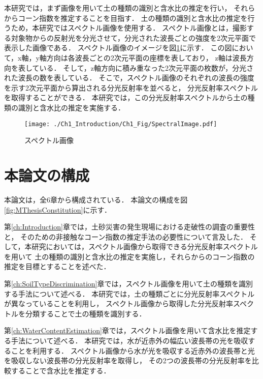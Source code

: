 本研究では，まず画像を用いて土の種類の識別と含水比の推定を行い，
それらからコーン指数を推定することを目指す．
土の種類の識別と含水比の推定を行うため，本研究ではスペクトル画像を使用する．
スペクトル画像とは，撮影する対象物からの反射光を分光させて，分光された波長ごとの強度を2次元平面で表示した画像である\cite{Tominaga1999}．
スペクトル画像のイメージを図\ref{fig:spectral_image}に示す．
この図において，x軸，y軸方向は各波長ごとの2次元平面の座標を表しており，
z軸は波長方向を表している．
そして，z軸方向に積み重なった2次元平面の枚数が，分光された波長の数を表している．
そこで，スペクトル画像のそれぞれの波長の強度を示す2次元平面から算出される分光反射率を並べると，
分光反射率スペクトルを取得することができる．
本研究では，この分光反射率スペクトルから土の種類の識別と含水比の推定を実施する．

\begin{figure}[bh]
	\begin{center}
	\centering
	\texttt{[image: ./Ch1\_Introduction/Ch1\_Fig/SpectralImage.pdf]}
	\caption{スペクトル画像}\label{fig:spectral_image}
	\end{center}
\end{figure}

\clearpage


\section{本論文の構成}\label{sec:Structure}

本論文は，全6章から構成されている．
本論文の構成を\mbox{図\ref{fig:MThesisConstitution}}に示す．

第\ref{ch:Introduction}章では，土砂災害の発生現場における走破性の調査の重要性と，
そのための非接触なコーン指数の推定手法の必要性について言及した．
そして，本研究においては，スペクトル画像から取得できる分光反射率スペクトルを用いて
土の種類の識別と含水比の推定を実施し，それらからのコーン指数の推定を目標とすることを述べた．

第\ref{ch:SoilTypeDiscrimination}章では，スペクトル画像を用いて土の種類を識別する手法について述べる．
本研究では，土の種類ごとに分光反射率スペクトルが異なっていることを利用し，
スペクトル画像から取得した分光反射率スペクトルを分類することで土の種類を識別する．

第\ref{ch:WaterContentEstimation}章では，スペクトル画像を用いて含水比を推定する手法について述べる．
本研究では，水が近赤外の幅広い波長帯の光を吸収することを利用する．
スペクトル画像から水が光を吸収する近赤外の波長帯と光を吸収しない波長帯の分光反射率を取得し，
その2つの波長帯の分光反射率を比較することで含水比を推定する．

